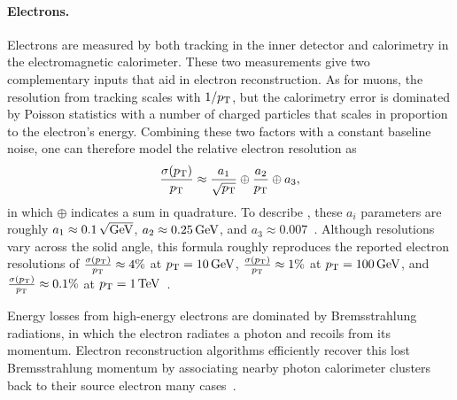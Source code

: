 \paragraph{Electrons.}
Electrons are measured by both tracking in the inner detector and calorimetry
in the electromagnetic calorimeter.
These two measurements give two complementary inputs that aid in electron
reconstruction.
As for muons, the resolution from tracking scales with $1/\pt$, but the
calorimetry error is dominated by Poisson statistics with a number of charged
particles that scales in proportion to the electron's energy.
Combining these two factors with a constant baseline noise, one can therefore
model the relative electron resolution as
\begin{equation}
\label{eqn:experiment_electron_resolution}
\frac{\sigma(\pt)}{\pt}
\approx
\frac{a_1}{\sqrt{\pt}}
\oplus
\frac{a_2}{\pt}
\oplus
a_3
,
\end{equation}
in which $\oplus$ indicates a sum in quadrature.
To describe \atlas, these $a_i$ parameters are roughly
$a_1 \approx 0.1\,\sqrt{\eV[G]}$,
$a_2 \approx 0.25\,\eV[G]$, and
$a_3 \approx 0.007$~\cite{nackenhorst2010top, Lester:705139, ERDMANN201418}.
Although resolutions vary across the solid angle, this formula roughly
reproduces the reported electron resolutions of
$\frac{\sigma(\pt)}{\pt} \approx 4\%$ at $\pt = 10\,\eV[G]$,
$\frac{\sigma(\pt)}{\pt} \approx 1\%$ at $\pt = 100\,\eV[G]$, and
$\frac{\sigma(\pt)}{\pt} \approx 0.1\%$ at
$\pt = 1\,\eV[T]$~\cite{atlas2019electron}.

Energy losses from high-energy electrons are dominated by Bremsstrahlung
radiations, in which the electron radiates a photon and recoils from its
momentum.
Electron reconstruction algorithms efficiently recover this lost Bremsstrahlung
momentum by associating nearby photon calorimeter clusters back to their source
electron many cases~\cite{atlas1994proposal, atlas1999design1}.

